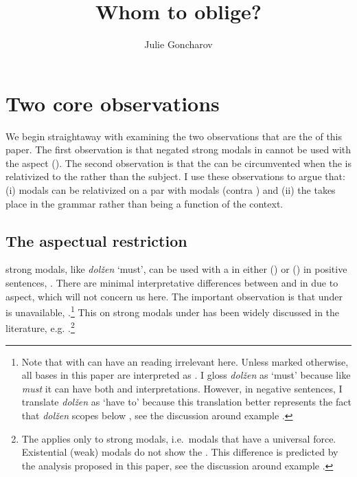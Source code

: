\documentclass[output=paper,newtxmath,colorlinks,citecolor=brown]{langsci/langscibook}
\title{Whom to oblige?}
\author{Julie Goncharov\affiliation{Hebrew University of Jerusalem / University of Göttingen}}
\begin{document}
\maketitle

\section{Two core observations}\label{sect:coreobs}
We begin straightaway with examining the two observations that are the  of this paper. The first observation is that negated strong  modals in  cannot be used with the  aspect  (). The second observation is that the  can be circumvented when the  is relativized to the  rather than the subject. I use these observations to argue that: (i)  modals can be relativized on a par with  modals (contra \citealt{ret16}) and (ii) the  takes place in the grammar rather than being a function of the context.


\subsection{The aspectual restriction}
 strong  modals, like \textit{dolžen} 	`must', can be used with a  in either \textsc{ ()} or \textsc{ ()} in positive sentences, . There are minimal interpretative differences between \im and \p in  due to aspect, which will not concern us here.  The important observation is that  under  \p is unavailable, .\footnote{Note that  with \p can have an  reading irrelevant here. Unless marked otherwise, all  bases in this paper are interpreted as . I gloss \textit{dolžen} as `must' because like  \textit{must} it can have both  and  interpretations. However, in negative sentences, I translate \textit{dolžen} as `have to' because this translation better represents the fact that \textit{dolžen} scopes below , see the discussion around  example .
}
This  on  strong  modals under  has been widely discussed in the literature, e.g. \cite{for70,rap85,haa97,zal06,pad13}.\footnote{The  applies only to strong  modals, i.e.\ modals that have a universal force. Existential (weak)  modals do not show the . This difference is predicted by the analysis proposed in this paper, see the discussion around example .
}
\end{document}
